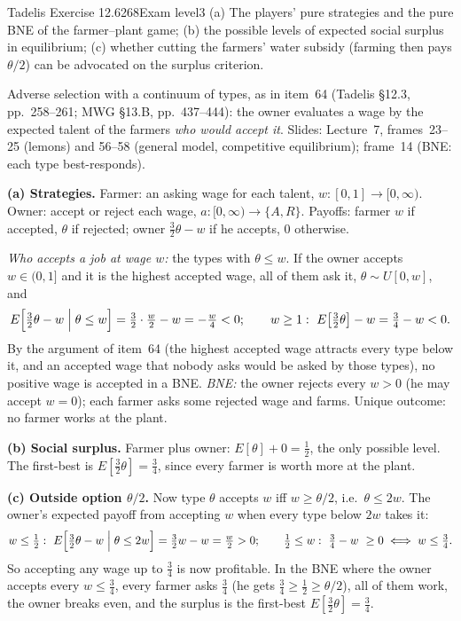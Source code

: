 \begin{exsol}{Tadelis Exercise 12.6}{268}{Exam level}{3}
\asked (a) The players' pure strategies and the pure BNE of the farmer--plant game; (b) the possible levels
of expected social surplus in equilibrium; (c) whether cutting the farmers' water subsidy (farming then pays
$\theta/2$) can be advocated on the surplus criterion.

\method Adverse selection with a continuum of types, as in item~64 (Tadelis \S12.3, pp.~258--261; MWG
\S13.B, pp.~437--444): the owner evaluates a wage by the expected talent of the farmers \emph{who would
accept it}. Slides: Lecture~7, frames~23--25 (lemons) and 56--58 (general model, competitive equilibrium);
frame~14 (BNE: each type best-responds).

\solution
\textbf{(a) Strategies.} Farmer: an asking wage for each talent, $w : [0,1] \to [0, \infty)$. Owner: accept or
reject each wage, $a : [0,\infty) \to \{A, R\}$. Payoffs: farmer $w$ if accepted, $\theta$ if rejected; owner
$\frac32\theta - w$ if he accepts, $0$ otherwise.

\emph{Who accepts a job at wage $w$:} the types with $\theta \le w$. If the owner accepts $w \in (0, 1]$ and
it is the highest accepted wage, all of them ask it, $\theta \sim U[0, w]$, and
\[
  E\Bigl[\tfrac32\theta - w \Bigm| \theta \le w\Bigr] = \tfrac32\cdot\tfrac w2 - w = -\tfrac w4 < 0 ;
  \qquad w \ge 1:\ E\bigl[\tfrac32\theta\bigr] - w = \tfrac34 - w < 0 .
\]
By the argument of item~64 (the highest accepted wage attracts every type below it, and an accepted wage
that nobody asks would be asked by those types), no positive wage is accepted in a BNE. \emph{BNE:} the owner
rejects every $w > 0$ (he may accept $w = 0$); each farmer asks some rejected wage and farms. Unique outcome:
no farmer works at the plant.

\textbf{(b) Social surplus.} Farmer plus owner: $E[\theta] + 0 = \frac12$, the only possible level. The
first-best is $E[\frac32\theta] = \frac34$, since every farmer is worth more at the plant.

\textbf{(c) Outside option $\theta/2$.} Now type $\theta$ accepts $w$ iff $w \ge \theta/2$, i.e.\
$\theta \le 2w$. The owner's expected payoff from accepting $w$ when every type below $2w$ takes it:
\[
  w \le \tfrac12:\ E\Bigl[\tfrac32\theta - w \Bigm| \theta \le 2w\Bigr] = \tfrac32 w - w = \tfrac w2 > 0 ;
  \qquad \tfrac12 \le w:\ \tfrac34 - w \ \ge 0 \iff w \le \tfrac34 .
\]
So accepting any wage up to $\frac34$ is now profitable. In the BNE where the owner accepts every $w \le \frac34$,
every farmer asks $\frac34$ (he gets $\frac34 \ge \frac12 \ge \theta/2$), all of them work, the owner breaks
even, and the surplus is the first-best $E[\frac32\theta] = \frac34$.


\end{exsol}
